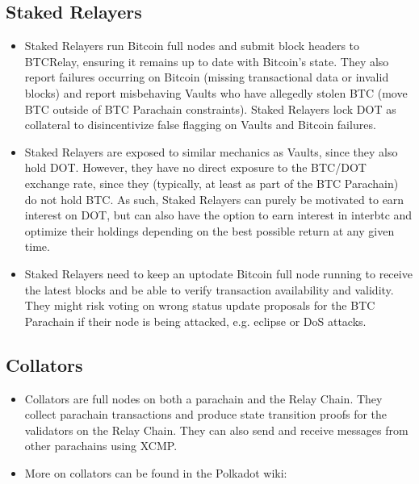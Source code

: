 \documentclass[a4paper,10pt,english]{sphinxmanual}
\begin{document}
\subsection{Staked Relayers}
\label{\detokenize{economics/incentives:staked-relayers}}\begin{itemize}
\item {} 
 Staked Relayers run Bitcoin full nodes and submit block headers to BTC\sphinxhyphen{}Relay, ensuring it remains up to date with Bitcoin’s state. They also report failures occurring on Bitcoin (missing transactional data or invalid blocks) and report misbehaving Vaults who have allegedly stolen BTC (move BTC outside of BTC Parachain constraints). Staked Relayers lock DOT as collateral to disincentivize false ﬂagging on Vaults and Bitcoin failures.

\item {} 
 Staked Relayers are exposed to similar mechanics as Vaults, since they also hold DOT. However, they have no direct exposure to the BTC/DOT exchange rate, since they (typically, at least as part of the BTC Parachain) do not hold BTC. As such, Staked Relayers can purely be motivated to earn interest on DOT, but can also have the option to earn interest in interbtc and optimize their holdings depending on the best possible return at any given time.

\item {} 
 Staked Relayers need to keep an up\sphinxhyphen{}to\sphinxhyphen{}date Bitcoin full node running to receive the latest blocks and be able to verify transaction availability and validity. They might risk voting on wrong status update proposals for the BTC Parachain if their node is being attacked, e.g. eclipse or DoS attacks.

\end{itemize}


\subsection{Collators}
\label{\detokenize{economics/incentives:collators}}\begin{itemize}
\item {} 
 Collators are full nodes on both a parachain and the Relay Chain. They collect parachain transactions and produce state transition proofs for the validators on the Relay Chain. They can also send and receive messages from other parachains using XCMP.

\item {} 
More on collators can be found in the Polkadot wiki: 

\end{itemize}
\end{document}
